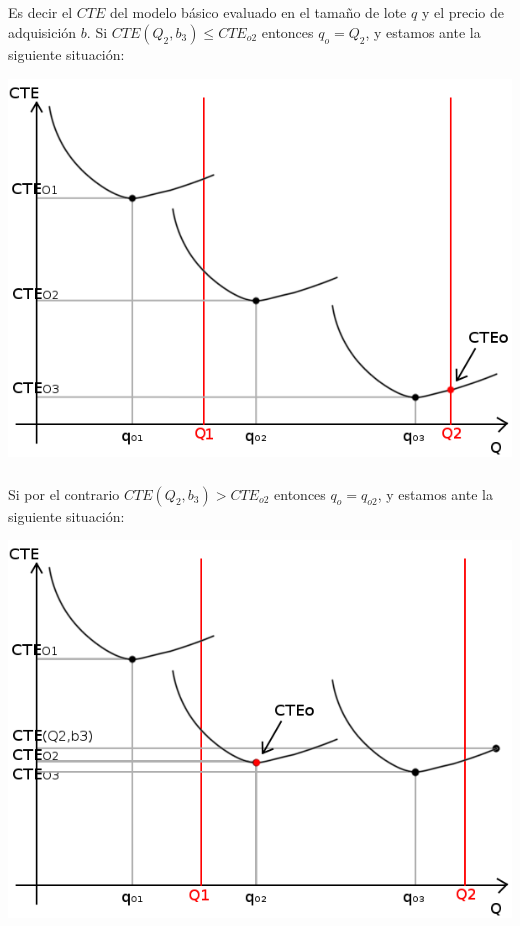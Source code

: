 \documentclass{article}
\begin{document}
	\subparagraph{} Es decir el $CTE$ del modelo básico evaluado en el tamaño de lote $q$ y el precio de adquisición $b$. Si $CTE(Q_2, b_3) \leq CTE_{o2}$ entonces $q_o = Q_2$, y estamos ante la siguiente situación:

	\begin{center}
	\includegraphics[scale=0.4,keepaspectratio=true]{img/6/6_CTE_Q2.png} 
	\end{center}

	\subparagraph{} Si por el contrario $CTE(Q_2, b_3) > CTE_{o2}$ entonces $q_o = q_{o2}$, y estamos ante la siguiente situación:

	\begin{center}
	\includegraphics[scale=0.4,keepaspectratio=true]{img/6/6_CTE_2.png} 
	\end{center}
\end{document}

